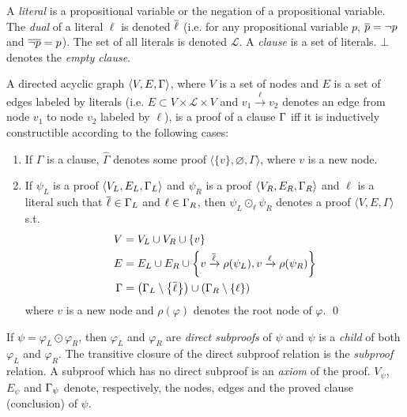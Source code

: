 \documentclass{llncs}
\begin{document}
A \emph{literal} is a propositional variable or the negation of a propositional variable. The
\emph{dual} of a literal $\ell$ is denoted $\overline{\ell}$ (i.e. for any propositional variable $p$,
$\overline{p} = \neg p$ and $\overline{\neg p} = p$). The set of all literals is denoted $\mathcal{L}$. A
\emph{clause} is a set of literals. $\bot$ denotes the \emph{empty clause}.


\newcommand{\axiom}[1]{\widehat{#1}}
\newcommand{\n}{v}
\newcommand{\raiz}[1]{\rho(#1)}

\begin{definition}[Proof] 
\label{def:proof}
A directed acyclic graph $\langle V, E, \Gamma \rangle$, where $V$ is a set of nodes and $E$ is a
set of edges labeled by literals (i.e. $E \subset V \times \mathcal{L} \times V$ and $\n_1
\xrightarrow{\ell} \n_2$ denotes an edge from node $\n_1$ to node $\n_2$ labeled by $\ell$), is a
proof of a clause $\Gamma$ iff it is inductively constructible according to the following cases:
%
\begin{enumerate}
  \item If $\Gamma$ is a clause, $\axiom{\Gamma}$ denotes some proof $\langle \{ \n \}, \varnothing,
    \Gamma \rangle$, where $\n$ is a new node.
  \item If $\psi_L$ is a proof $\langle V_L, E_L, \Gamma_L \rangle$ and
    $\psi_R$ is a proof $\langle V_R, E_R, \Gamma_R \rangle$ and $\ell$ is a literal such that
    $\overline{\ell} \in \Gamma_L$ and $\ell \in \Gamma_R$, then
    $\psi_L \odot_\ell \psi_R$ denotes a proof $\langle V, E, \Gamma \rangle$ s.t.
    \begin{align*}
      V &= V_L \cup V_R \cup \{\n \} \\
      E &= E_L \cup E_R \cup
                    \left\{ \n \xrightarrow{\dual{\ell}} \raiz{\psi_L}, \n \xrightarrow{\ell} \raiz{\psi_R} \right\} \\
     \Gamma &= \left( \clause_L \setminus \left\{ \dual{\ell} \right\} \right) \cup \left( \clause_R
                    \setminus \left\{ \ell \right\} \right)
    \end{align*}
    where $\n$ is a new node and $\raiz{\varphi}$ denotes the root node of $\varphi$.
  \qed
\end{enumerate}
\end{definition}


\newcommand{\Vertices}[1]{V_{#1}}
\newcommand{\Edges}[1]{E_{#1}}
\newcommand{\Conclusion}[1]{\clause_{#1}}

\noindent
If $\psi = \varphi_L \odot \varphi_R$, then $\varphi_L$ and $\varphi_R$ are \emph{direct subproofs}
of $\psi$ and $\psi$ is a \emph{child} of both $\varphi_L$ and $\varphi_R$. The transitive closure of
the direct subproof relation is the \emph{subproof} relation. A subproof which has no direct
subproof is an \emph{axiom} of the proof.
%
$\Vertices{\psi}$, $\Edges{\psi}$ and $\Conclusion{\psi}$
denote, respectively, the nodes, edges and the proved clause (conclusion) of $\psi$.
\end{document}
